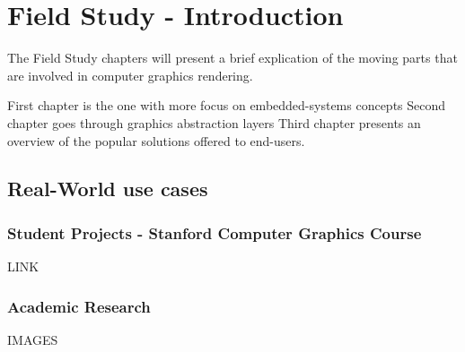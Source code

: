 



\chapter*{Field Study - Introduction}
  The Field Study chapters will present a brief explication of the moving parts that are involved in computer graphics rendering.

  First chapter is the one with more focus on embedded-systems concepts 
  Second chapter goes through graphics abstraction layers 
  Third chapter presents an overview of the popular solutions offered to end-users. 
  \section*{Real-World use cases}
      \subsection*{Student Projects - Stanford Computer Graphics Course}
          LINK
      \subsection*{Academic Research}
          IMAGES


